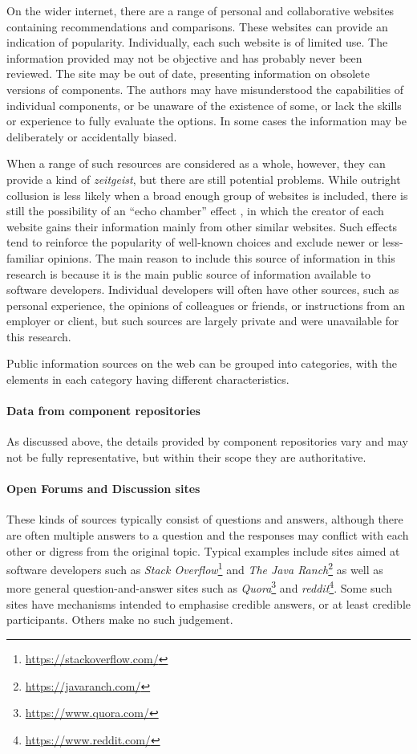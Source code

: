 On the wider internet, there are a range of personal and collaborative websites containing recommendations and comparisons. These websites can provide an indication of popularity. Individually, each such website is of limited use. The information provided may not be objective and has probably never been reviewed. The site may be out of date, presenting information on obsolete versions of components. The authors may have misunderstood the capabilities of individual components, or be unaware of the existence of some, or lack the skills or experience to fully evaluate the options. In some cases the information may be deliberately or accidentally biased.

When a range of such resources are considered as a whole, however, they can provide a kind of \emph{zeitgeist}, but there are still potential problems. While outright collusion is less likely when a broad enough group of websites is included, there is still the possibility of an \enquote{echo chamber} effect \citep{Cinelli2021}, in which the creator of each website gains their information mainly from other similar websites. Such effects tend to reinforce the popularity of well-known choices and exclude newer or less-familiar opinions. The main reason to include this source of information in this research is because it is the main public source of information available to software developers. Individual developers will often have other sources, such as personal experience, the opinions of colleagues or friends, or instructions from an employer or client, but such sources are largely private and were unavailable for this research.

Public information sources on the web can be grouped into categories, with the elements in each category having different characteristics.

\paragraph{Data from component repositories} As discussed above, the details provided by component repositories vary and may not be fully representative, but within their scope they are authoritative.
    
\paragraph{Open Forums and Discussion sites} These kinds of sources typically consist of questions and answers, although there are often multiple answers to a question and the responses may conflict with each other or digress from the original topic. Typical examples include sites aimed at software developers such as \emph{Stack Overflow}\footnote{\url{https://stackoverflow.com/}} and \emph{The Java Ranch}\footnote{\url{https://javaranch.com/}} as well as more general question-and-answer sites such as \emph{Quora}\footnote{\url{https://www.quora.com/}} and \emph{reddit}\footnote{\url{https://www.reddit.com/}}. Some such sites have mechanisms intended to emphasise credible answers, or at least credible participants. Others make no such judgement.
    
